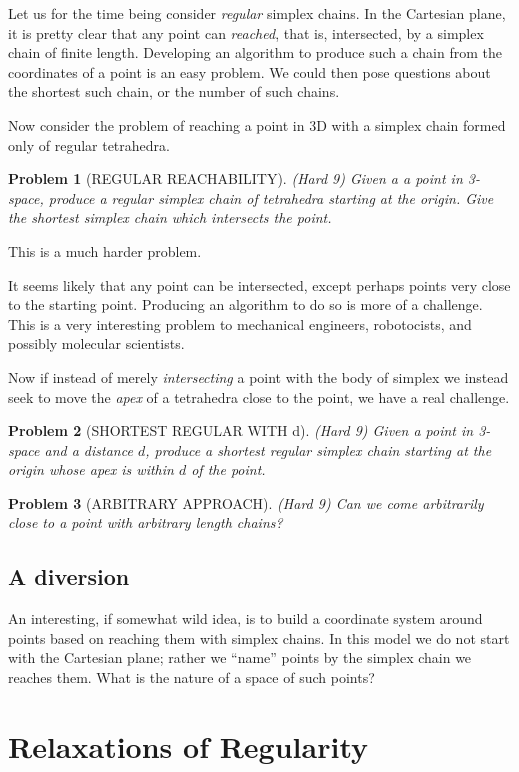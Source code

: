 \documentclass[11pt]{article}
\newtheorem{problem}{Problem}
\begin{document}
Let us for the time being consider {\em regular} simplex chains.  In the Cartesian plane, it is pretty clear that any point can {\em reached},
that is, intersected, by a simplex chain of finite length. Developing an algorithm to produce such a chain from the coordinates of a point
is an easy problem. We could then pose questions about the shortest such chain, or the number of such chains.

Now consider the problem of reaching a point in 3D with a simplex chain formed only of regular tetrahedra.
\begin{problem}[REGULAR REACHABILITY]
  (Hard 9)  Given a a point in 3-space, produce a regular simplex chain of tetrahedra starting at the origin.
  Give the shortest simplex chain which intersects the point.
\end{problem}
This is a much harder problem.

It seems likely that any point can be intersected, except perhaps points very close to the starting point. Producing an algorithm to do so
is more of a challenge. This is a very interesting problem to mechanical engineers, robotocists, and possibly molecular scientists.

Now if instead of merely {\em intersecting} a point with the body of simplex we instead seek to move the {\em apex} of a tetrahedra close
to the point, we have a real challenge.
\begin{problem}[SHORTEST REGULAR WITH d]
  (Hard 9) Given a point in 3-space and a distance $d$, produce a shortest regular simplex chain starting at the origin whose apex
  is within $d$ of the point.
\end{problem}

\begin{problem}[ARBITRARY APPROACH]
(Hard 9) Can we come arbitrarily close to a point with arbitrary length chains?
\end{problem}

\subsection{A diversion}
An interesting, if somewhat wild idea, is to build a coordinate system around points based on reaching them with simplex chains. In this model
we do not start with the Cartesian plane; rather we ``name'' points by the simplex chain we reaches them. What is the nature of a space
of such points? 



\section{Relaxations of Regularity}
\end{document}
